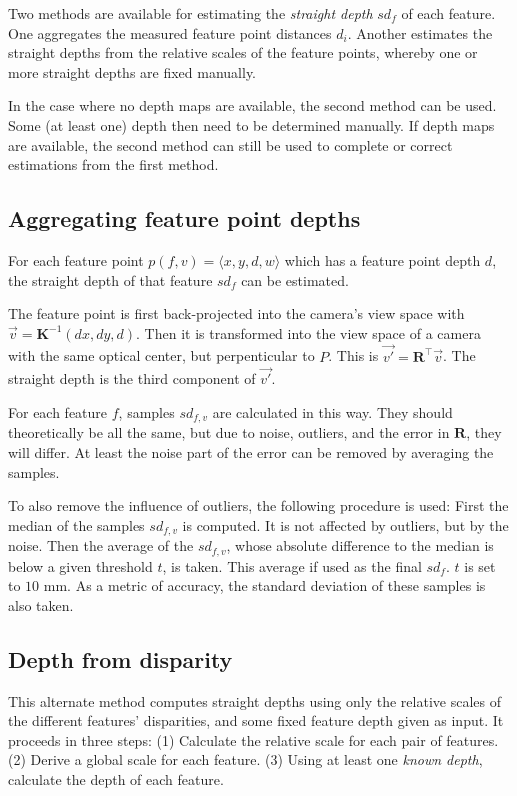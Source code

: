 \documentclass{scrreprt}
\newcommand{\matr}[1]{\mathbf{#1}}
\newcommand{\transpose}[1]{#1^\intercal}
\begin{document}
Two methods are available for estimating the \emph{straight depth} $sd_f$ of each feature. One aggregates the measured feature point distances $d_i$. Another estimates the straight depths from the relative scales of the feature points, whereby one or more straight depths are fixed manually.

In the case where no depth maps are available, the second method can be used. Some (at least one) depth then need to be determined manually. If depth maps are available, the second method can still be used to complete or correct estimations from the first method.

\subsection{Aggregating feature point depths}
\label{sec:sdepth_from_depth}
For each feature point $p(f,v) = \langle x,y,d,w \rangle$ which has a feature point depth $d$, the straight depth of that feature $sd_{f}$ can be estimated.

The feature point is first back-projected into the camera's view space with $\vec{v} = \matr{K}^{-1} (d x, d y, d)$. Then it is transformed into the view space of a camera with the same optical center, but perpenticular to $P$. This is $\vec{v'} = \transpose{\matr{R}} \vec{v}$. The straight depth is the third component of $\vec{v'}$.

For each feature $f$, samples $sd_{f,v}$ are calculated in this way. They should theoretically be all the same, but due to noise, outliers, and the error in $\matr{R}$, they will differ. At least the noise part of the error can be removed by averaging the samples.

To also remove the influence of outliers, the following procedure is used: First the median of the samples $sd_{f,v}$ is computed. It is not affected by outliers, but by the noise. Then the average of the $sd_{f,v}$, whose absolute difference to the median is below a given threshold $t$, is taken. This average if used as the final $sd_f$. $t$ is set to $10 \text{ mm}$. As a metric of accuracy, the standard deviation of these samples is also taken.

\subsection{Depth from disparity}
This alternate method computes straight depths using only the relative scales of the different features' disparities, and some fixed feature depth given as input. It proceeds in three steps: (1) Calculate the relative scale for each pair of features. (2) Derive a global scale for each feature. (3) Using at least one \emph{known depth}, calculate the depth of each feature.
\end{document}
